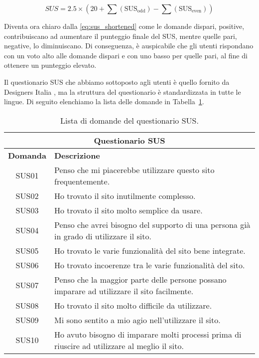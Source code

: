 \begin{equation}
    SUS = 2.5 \times \left( 20 + \sum (\text{SUS}_{\text{odd}}) - \sum (\text{SUS}_{\text{even}}) \right)
    \label{eq:sus_shortened}
\end{equation}

Diventa ora chiaro dalla \eqref{eq:sus_shortened} come le domande dispari, positive, contribuiscano ad aumentare il punteggio finale del SUS, mentre quelle pari, negative, lo diminuiscano. Di conseguenza, è auspicabile che gli utenti rispondano con un voto alto alle domande dispari e con uno basso per quelle pari, al fine di ottenere un punteggio elevato.

Il questionario SUS che abbiamo sottoposto agli utenti è quello fornito da Designers Italia \cite{SUS_DesignersItalia}, ma la struttura del questionario è standardizzata in tutte le lingue. Di seguito elenchiamo la lista delle domande in Tabella~\ref{tab:sus_questions}.

\begin{center}
    \begin{table}[H]
        \centering
        \begin{tabularx}{1.02\textwidth}{|c|X|}
            \hline
            \multicolumn{2}{|c|}{\textbf{Questionario SUS}} \\
            \hline
            \textbf{Domanda} & \textbf{Descrizione}\\
            \hline
            SUS01 & Penso che mi piacerebbe utilizzare questo sito frequentemente.\\
            SUS02 & Ho trovato il sito inutilmente complesso.\\
            SUS03 & Ho trovato il sito molto semplice da usare.\\
            SUS04 & Penso che avrei bisogno del supporto di una persona già in grado di utilizzare il sito.\\
            SUS05 & Ho trovato le varie funzionalità del sito bene integrate.\\
            SUS06 & Ho trovato incoerenze tra le varie funzionalità del sito.\\
            SUS07 & Penso che la maggior parte delle persone possano imparare ad utilizzare il sito facilmente.\\
            SUS08 & Ho trovato il sito molto difficile da utilizzare.\\
            SUS09 & Mi sono sentito a mio agio nell'utilizzare il sito.\\
            SUS10 & Ho avuto bisogno di imparare molti processi prima di riuscire ad utilizzare al meglio il sito.\\
            \hline
        \end{tabularx}
        \caption[Lista di domande del questionario SUS]{Lista di domande del questionario SUS.}
        \label{tab:sus_questions}
    \end{table}
\end{center}

